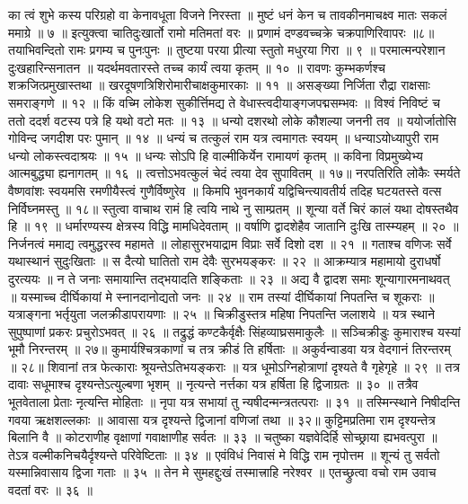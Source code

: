 का त्वं शुभे कस्य परिग्रहो वा केनावधूता विजने निरस्ता ॥
मुष्टं धनं केन च तावकीनमाचक्ष्व मातः सकलं ममाग्रे ॥ ७ ॥
इत्युक्त्वा चातिदुःखार्तो रामो मतिमतां वरः ॥
प्रणामं दण्डवच्चक्रे चक्रपाणिरिवापरः ॥८॥
तयाभिवन्दितो रामः प्रगम्य च पुनःपुनः ॥
तुष्टया परया प्रीत्या स्तुतो मधुरया गिरा ॥ ९ ॥
परमात्मन्परेशान दुःखहारिन्सनातन ॥
यदर्थमवतारस्ते तच्च कार्यं त्वया कृतम् ॥ १० ॥
रावणः कुम्भकर्णश्च शक्रजित्प्रमुखास्तथा ॥
खरदूषणत्रिशिरोमारीचाक्षकुमारकाः ॥ ११ ॥
असङ्ख्या निर्जिता रौद्रा राक्षसाः समराङ्गणे ॥ १२ ॥
किं वच्मि लोकेश सुकीर्त्तिमद्य ते वेधास्त्वदीयाङ्गजपद्मसम्भवः ॥
विश्वं निविष्टं च ततो ददर्श वटस्य पत्रे हि यथो वटो मतः ॥ १३ ॥
धन्यो दशरथो लोके कौशल्या जननी तव ॥
ययोर्जातोसि गोविन्द जगदीश परः पुमान् ॥ १४ ॥
धन्यं च तत्कुलं राम यत्र त्वमागतः स्वयम् ॥
धन्याऽयोध्यापुरी राम धन्यो लोकस्त्वदाश्रयः ॥ १५ ॥
धन्यः सोऽपि हि वाल्मीकिर्येन रामायणं कृतम् ॥
कविना विप्रमुख्येभ्य आत्मबुद्ध्या ह्यनागतम् ॥ १६ ॥
त्वत्तोऽभवत्कुलं चेदं त्वया देव सुपावितम् ॥ १७॥
नरपतिरिति लोकैः स्मर्यते वैष्णवांशः स्वयमसि रमणीयैस्त्वं गुणैर्विष्णुरेव ॥
किमपि भुवनकार्यं यद्विचिन्त्यावतीर्य तदिह घटयतस्ते वत्स निर्विघ्नमस्तु ॥ १८॥
स्तुत्वा वाचाथ रामं हि त्वयि नाथे नु साम्प्रतम् ॥
शून्या वर्ते चिरं कालं यथा दोषस्तथैव हि ॥ १९ ॥
धर्मारण्यस्य क्षेत्रस्य विद्धि मामधिदेवताम् ॥
वर्षाणि द्वादशेहैव जातानि दुःखि तास्म्यहम् ॥ २० ॥
निर्जनत्वं ममाद्य त्वमुद्धरस्व महामते ॥
लोहासुरभयाद्राम विप्राः सर्वे दिशो दश ॥ २१ ॥
गताश्च वणिजः सर्वे यथास्थानं सुदुःखिताः ॥
स दैत्यो घातितो राम देवैः सुरभयङ्करः ॥ २२ ॥
आक्रम्यात्र महामायो दुराधर्षो दुरत्ययः ॥
न ते जनाः समायान्ति तद्भयादति शङ्किताः ॥ २३ ॥
अद्य वै द्वादश समाः शून्यागारमनाथवत् ॥
यस्माच्च दीर्घिकायां मे स्नानदानोद्यतो जनः ॥ २४ ॥
राम तस्यां दीर्घिकायां निपतन्ति च शूकराः ॥
यत्राङ्गना भर्तृयुता जलक्रीडापरायणाः ॥ २५ ॥
चिक्रीडुस्तत्र महिषा निपतन्ति जलाशये ॥
यत्र स्थाने सुपुष्पाणां प्रकरः प्रचुरोऽभवत् ॥ २६ ॥
तद्रुद्धं कण्टकैर्वृक्षैः सिंहव्याघ्रसमाकुलैः ॥
सञ्चिक्रीडुः कुमाराश्च यस्यां भूमौ निरन्तरम् ॥ २७॥
कुमार्यश्चित्रकाणां च तत्र क्रीडं ति हर्षिताः ॥
अकुर्वन्वाडवा यत्र वेदगानं तिरन्तरम् ॥ २८॥
शिवानां तत्र फेत्काराः श्रूयन्तेऽतिभयङ्कराः ॥
यत्र धूमोऽग्निहोत्राणां दृश्यते वै गृहेगृहे ॥ २९ ॥
तत्र दावाः सधूमाश्च दृश्यन्तेऽत्युल्बणा भृशम् ॥
नृत्यन्ते नर्त्तका यत्र हर्षिता हि द्विजाग्रतः ॥ ३० ॥
तत्रैव भूतवेताला प्रेताः नृत्यन्ति मोहिताः ॥
नृपा यत्र सभायां तु न्यषीदन्मन्त्रतत्पराः ॥ ३१ ॥
तस्मिन्स्थाने निषीदन्ति गवया ऋक्षशल्लकाः ॥
आवासा यत्र दृश्यन्ते द्विजानां वणिजां तथा ॥ ३२॥
कुट्टिमप्रतिमा राम दृश्यन्तेत्र बिलानि वै ॥
कोटराणीह वृक्षाणां गवाक्षाणीह सर्वतः ॥ ३३ ॥
चतुष्का यज्ञवेदिर्हि सोच्छ्राया ह्यभवत्पुरा ॥
तेऽत्र वल्मीकनिचयैर्दृश्यन्ते परिवेष्टिताः ॥ ३४ ॥
एवंविधं निवासं मे विद्धि राम नृपोत्तम ॥
शून्यं तु सर्वतो यस्मान्निवासाय द्विजा गताः ॥ ३५ ॥
तेन मे सुमहद्दुःखं तस्मात्त्राहि नरेश्वर ॥
एतच्छ्रुत्वा वचो राम उवाच वदतां वरः ॥ ३६ ॥

